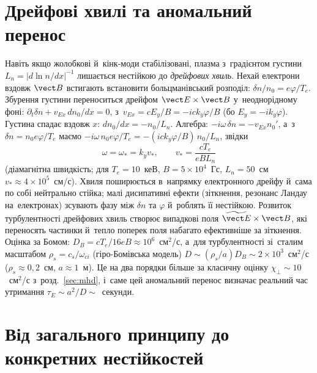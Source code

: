 \section{Дрейфові хвилі та аномальний перенос}\label{sec:drift-waves}

Навіть якщо жолобкові й~кінк-моди стабілізовані, плазма з~градієнтом густини $L_n=|d\ln n/dx|^{-1}$
лишається нестійкою до \emph{дрейфових хвиль}. Нехай електрони вздовж $\vect B$ встигають
встановити больцманівський розподіл: $\delta n/n_0=e\varphi/T_e$. Збурення густини
переноситься дрейфом $\vect E\times\vect B$ у~неоднорідному фоні: $\partial_t\delta n+v_{Ex}\,dn_0/dx=0$,
з~$v_{Ex}=cE_y/B=-ick_y\varphi/B$ (бо $E_y=-ik_y\varphi$). Густина спадає вздовж $x$: $dn_0/dx=-n_0/L_n$. Алгебра:
$-i\omega\,\delta n=-v_{Ex}n_0'$, а~з~$\delta n=n_0e\varphi/T_e$ маємо $-i\omega\,n_0e\varphi/T_e=-(ick_y\varphi/B)\,n_0/L_n$, звідки
\begin{equation}\label{eq:drift-wave}
	\omega=\omega_*=k_yv_*,\qquad v_*=\frac{cT_e}{eBL_n}
\end{equation}
(діамагнітна швидкість; для $T_e=10$~кеВ, $B=5\times10^4$~Гс, $L_n=50$~см $v_*\approx4\times10^5$~см/с).
Хвиля поширюється в~напрямку електронного дрейфу й~сама по собі нейтрально стійка; малі дисипативні ефекти
(зіткнення, резонанс Ландау на~електронах) зсувають фазу між $\delta n$ та $\varphi$ й~роблять її
нестійкою. Розвиток турбулентності дрейфових хвиль створює випадкові поля $\widetilde{\vect E}\times\vect B$,
які переносять частинки й~тепло поперек поля набагато ефективніше за зіткнення. Оцінка за
Бомом: $D_B=cT_e/16eB\approx10^6$~см$^2$/с, а~для турбулентності зі~сталим масштабом
$\rho_s=c_s/\omega_{ci}$ (гіро-Бомівська модель) $D\sim(\rho_s/a)D_B\sim2\times10^3$~см$^2$/с ($\rho_s\approx0{,}2$~см, $a\approx1$~м).
Це на два порядки більше за класичну оцінку $\chi_\perp\sim10$~см$^2$/с з~розд.~\ref{sec:mhd}, і~саме
цей аномальний перенос визначає реальний час утримання $\tau_E\sim a^2/D\sim$~секунди.

\section{Від загального принципу до конкретних нестійкостей}

